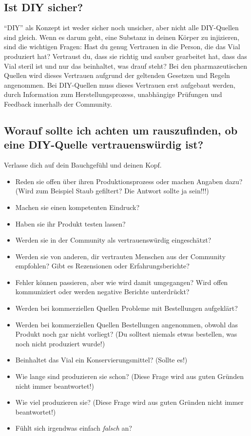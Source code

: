 \documentclass{article}
\begin{document}
\subsection{Ist DIY sicher?}

“DIY” als Konzept ist weder sicher noch unsicher, aber nicht alle DIY-Quellen sind gleich. Wenn es darum geht, eine Substanz in deinen Körper zu injizieren, sind die wichtigen Fragen: Hast du genug Vertrauen in die Person, die das Vial produziert hat? Vertraust du, dass sie richtig und sauber gearbeitet hat, dass das Vial steril ist und nur das beinhaltet, was drauf steht? Bei den pharmazeutischen Quellen wird dieses Vertrauen aufgrund der geltenden Gesetzen und Regeln angenommen. Bei DIY-Quellen muss dieses Vertrauen erst aufgebaut werden, durch Information zum Herstellungsprozess, unabhängige Prüfungen und Feedback innerhalb der Community.

\subsection{Worauf sollte ich achten um rauszufinden, ob eine DIY-Quelle vertrauenswürdig ist?}

Verlasse dich auf dein Bauchgefühl und deinen Kopf. 

\begin{itemize}
  \item Reden sie offen über ihren Produktionsprozess oder machen Angaben dazu? (Wird zum Beispiel Staub gefiltert? Die Antwort sollte ja sein!!!)
  \item Machen sie einen kompetenten Eindruck?
  \item Haben sie ihr Produkt testen lassen? 
  \item Werden sie in der Community als vertrauenswürdig eingeschätzt?
  \item Werden sie von anderen, dir vertrauten Menschen aus der Community empfohlen? Gibt es Rezensionen oder Erfahrungsberichte? 
  \item Fehler können passieren, aber wie wird damit umgegangen? Wird offen kommuniziert oder werden negative Berichte unterdrückt?
  \item Werden bei kommerziellen Quellen Probleme mit Bestellungen aufgeklärt?
  \item Werden bei kommerziellen Quellen Bestellungen angenommen, obwohl das Produkt noch gar nicht vorliegt? (Du solltest niemals etwas bestellen, was noch nicht produziert wurde!)
  \item Beinhaltet das Vial ein Konservierungsmittel? (Sollte es!)
  \item Wie lange sind produzieren sie schon? (Diese Frage wird aus guten Gründen nicht immer beantwortet!)
  \item Wie viel produzieren sie? (Diese Frage wird aus guten Gründen nicht immer beantwortet!)
  \item Fühlt sich irgendwas einfach \textit{falsch} an?
\end{itemize}
\end{document}
